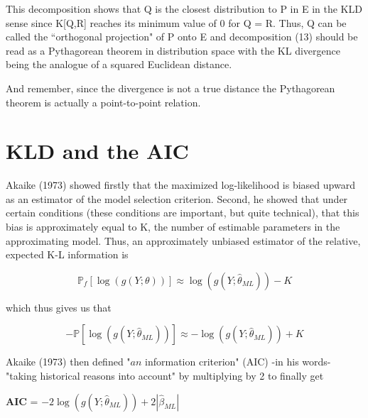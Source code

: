 \documentclass[10pt]{article}
\begin{document}
This decomposition shows that Q is the closest distribution to P in E in the KLD sense since K[Q,R] reaches its minimum value of 0 for Q = R. Thus, Q can be called the ``orthogonal projection" of P onto E and decomposition (13) should be read as a Pythagorean theorem in distribution space with the KL divergence being the analogue of a squared Euclidean distance.  

And remember, since the divergence is not a true distance the Pythagorean theorem is actually a point-to-point relation.



\newpage


\section{KLD and the AIC}

Akaike (1973) showed firstly that the maximized log-likelihood is biased upward as an estimator of the model selection criterion. Second, he showed that under certain conditions (these conditions are important, but quite technical), that this bias is approximately equal to K, the number of estimable parameters in the approximating model. Thus, an approximately unbiased estimator of the relative, expected K-L information is

\begin{dmath}
\mathbb{P}_f[\log(g(Y;\theta))] \approx \log(g(Y;\hat{\theta}_{ML})) -K
\end{dmath}

which thus gives us that

\begin{dmath}
-\mathbb{P}[\log(g(Y;\hat{\theta}_{ML}))] \approx -\log(g(Y;\hat{\theta}_{ML}))  + K
\end{dmath}

Akaike (1973) then defined "$an$ information criterion" (AIC) -in his words- "taking historical reasons into account" by multiplying by 2 to finally get

\begin{center}
\textbf{AIC} = $-2 \log(g(Y;\hat{\theta}_{ML})) + 2| \hat{\beta}_{ML} |$
\end{center}
\end{document}
